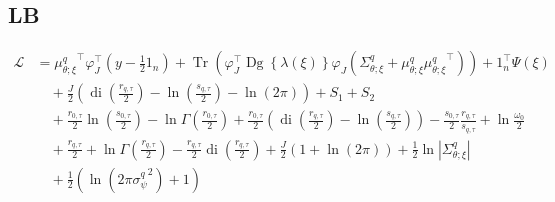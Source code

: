 \documentclass[11pt]{article}
\DeclareMathOperator{\Tr}{Tr}
\newcommand{\opn}{\operatorname}
\begin{document}
\subsection{LB}
\begin{align*}
  \mathcal{L} &= {\mu_{\theta;\xi}^{q}}^{\top}\varphi_{J}^{\top}\left(y -\frac{1}{2}1_{n}\right) + \Tr\left(\varphi_{J}^{\top}\opn{Dg}\left\{\lambda\left(\xi\right) \right\}\varphi_{J}\left(\Sigma_{\theta;\xi}^{q}+\mu_{\theta;\xi}^{q}{\mu_{\theta;\xi}^{q}}^{\top}\right)\right) + 1_{n}^{\top}\Psi\left(\xi\right)\\
  &\quad +\frac{J}{2}\left(\opn{di}\left(\frac{r_{q,\tau}}{2}\right)-\ln\left(\frac{s_{q,\tau}}{2}\right)-\ln\left(2\pi\right)\right) +S_{1}+S_{2}\\
  &\quad +\frac{r_{0,\tau}}{2}\ln\left(\frac{s_{0,\tau}}{2}\right)-\ln\Gamma\left(\frac{r_{0,\tau}}{2}\right) + \frac{r_{0,\tau}}{2}\left(\opn{di}\left(\frac{r_{q,\tau}}{2}\right)-\ln\left(\frac{s_{q,\tau}}{2}\right)\right) - \frac{s_{0,\tau}}{2}\frac{r_{q,\tau}}{s_{q,\tau}} +\ln\frac{\omega_{0}}{2}\\
  &\quad +\frac{r_{q,\tau}}{2} + \ln\Gamma\left(\frac{r_{q,\tau}}{2}\right) -\frac{r_{q,\tau}}{2}\opn{di}\left(\frac{r_{q,\tau}}{2}\right) + \frac{J}{2}\left(1+\ln\left(2\pi\right)\right) + \frac{1}{2}\ln\left|\Sigma_{\theta;\xi}^{q}\right|\\
  &\quad + \frac{1}{2}\left(\ln\left(2\pi{\sigma_{\psi}^{q}}^{2}\right)+1\right)
\end{align*}
\end{document}
